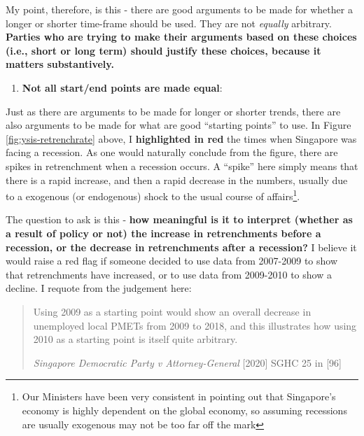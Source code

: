 \documentclass[
  openany]{book}
\providecommand{\tightlist}{%
  \setlength{\itemsep}{0pt}\setlength{\parskip}{0pt}}
\begin{document}
My point, therefore, is this - there are good arguments to be made for whether a longer or shorter time-frame should be used. They are not \emph{equally} arbitrary. \textbf{Parties who are trying to make their arguments based on these choices (i.e., short or long term) should justify these choices, because it matters substantively.}

\begin{enumerate}
\def\labelenumi{\arabic{enumi}.}
\setcounter{enumi}{1}
\tightlist
\item
  \textbf{Not all start/end points are made equal}:
\end{enumerate}

Just as there are arguments to be made for longer or shorter trends, there are also arguments to be made for what are good ``starting points'' to use. In Figure \ref{fig:ysis-retrenchrate} above, I \textbf{highlighted in red} the times when Singapore was facing a recession. As one would naturally conclude from the figure, there are spikes in retrenchment when a recession occurs. A ``spike'' here simply means that there is a rapid increase, and then a rapid decrease in the numbers, usually due to a exogenous (or endogenous) shock to the usual course of affairs\footnote{Our Ministers have been very consistent in pointing out that Singapore's economy is highly dependent on the global economy, so assuming recessions are usually exogenous may not be too far off the mark}.

The question to ask is this - \textbf{how meaningful is it to interpret (whether as a result of policy or not) the increase in retrenchments before a recession, or the decrease in retrenchments after a recession?} I believe it would raise a red flag if someone decided to use data from 2007-2009 to show that retrenchments have increased, or to use data from 2009-2010 to show a decline. I requote from the judgement here:

\begin{quote}
Using 2009 as a starting point would show an overall decrease in unemployed local PMETs from 2009 to 2018, and this illustrates how using 2010 as a starting point is itself quite arbitrary.

\emph{Singapore Democratic Party v Attorney-General} {[}2020{]} SGHC 25 in {[}96{]}
\end{quote}
\end{document}
